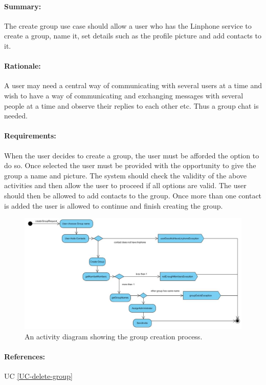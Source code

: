 \documentclass[11pt]{article}
\begin{document}
\paragraph{Summary:} The create group use case should allow a user who has the Linphone service to create a group, name it, set details such as the profile picture and add contacts to it.
\paragraph{Rationale:} A user may need a central way of communicating with several users at a time and wish to have a way of communicating and exchanging messages with several people at a time and observe their replies to each other etc. Thus a group chat is needed.
\paragraph{Requirements:} When the user decides to create a group, the user must be afforded the option to do so. Once selected the user must be provided with the opportunity to give the group a name and picture. The system should check the validity of the above activities and then allow the user to proceed if all options are valid. The user should then be allowed to add contacts to the group. Once more than one contact is added the user is allowed to continue and finish creating the group.
\begin{figure}[H]
\centering
\includegraphics[width=5in]{./images/process-create.jpg}
\caption[Create Group Activity Diagram]{An activity diagram showing the group creation process.}
\label{FR-figure-create-group}
\end{figure}
\paragraph{References:} UC \ref{UC-delete-group}
\end{document}
